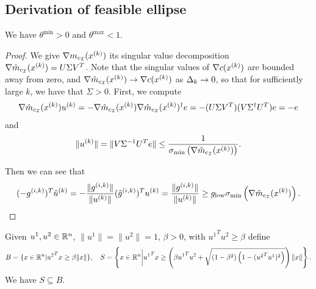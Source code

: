 \subsection{Derivation of feasible ellipse}


\begin{theorem}
We have $\theta^{\text{min}} > 0$ and $\theta^{\text{max}} < 1$.
\end{theorem}

\begin{proof}
We give $\nabla m_{c_{\mathcal I} }({x^{(k)}})$ its singular value decomposition $\nabla \hat m_{c_{\mathcal I} }({x^{(k)}}) = U\Sigma V^T$.
Note that the singular values of $\nabla c({x^{(k)}})$ are bounded away from zero, and $ \nabla \hat m_{c_{\mathcal I} }({x^{(k)}}) \to \nabla c({x^{(k)}})$ as $\Delta_k\to 0$,
so that for sufficiently large $k$, we have that $\Sigma > 0$.
First, we compute
\begin{align*}
\nabla \hat m_{c_{\mathcal I} }({x^{(k)}}) {u^{(k)}} = -\nabla\hat m_{c_{\mathcal I} }({x^{(k)}}) \nabla\hat m_{c_{\mathcal I} }({x^{(k)}})^{\dagger} e
= -(U\Sigma V^T)(V\Sigma^{\dagger} U^T)e
= -e 
\end{align*}
and
\begin{align*}
\|{u^{(k)}}\| = \|V\Sigma^{-1} U^Te\|  
\le \frac 1 {\sigma_{\text{min}}\left(\nabla \hat m_{c_{\mathcal I}}({x^{(k)}})\right)}.
\end{align*}

Then we can see that
\begin{align*}
(-{g^{(i, k)}})^T{{\hat u}^{(k)}} = -\frac{\|{g^{(i, k)}}\|}{\|{u^{(k)}}\|}({{\hat g}^{(i, k)}})^T{u^{(k)}} = \frac{\|{g^{(i, k)}}\|}{\|{u^{(k)}}\|} \ge g_{\text{low}} \sigma_{\text{min}}\left(\nabla \hat m_{c_{\mathcal I}}({x^{(k)}})\right). \\
\end{align*}



\end{proof}




\begin{theorem}
\label{cone_subset_cone}
Given $u^1, u^2 \in {\mathbb R^{n}}$, $\|u^1\| = \|u^2\|= 1$, $\beta >0$, with ${u^1}^Tu^2 \ge \beta$ define
\begin{align*}
B = \{x\in{\mathbb R^{n}} | {u^2}^Tx \ge \beta\|x\|\}, \quad
S = \left\{x\in{\mathbb R^{n}} \bigg| {u^1}^Tx \ge \left(\beta {u^1}^Tu^2 + \sqrt{(1 - \beta^2)\left(1 - ({u^2}^Tu^1)^2\right)}\right)\|x\| \right\}. 
\end{align*}
We have $S \subseteq B$.
\end{theorem}


